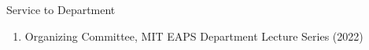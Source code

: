 \begin{rSection}{Service to Department}
	\begin{enumerate}
		\item Organizing Committee, MIT EAPS Department Lecture Series (2022)
	\end{enumerate}
\end{rSection}